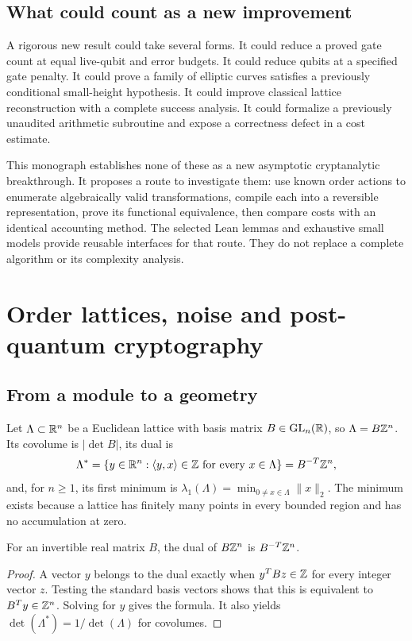 \section{What could count as a new improvement}
A rigorous new result could take several forms. It could reduce a proved gate count at equal live-qubit and error budgets. It could reduce qubits at a specified gate penalty. It could prove a family of elliptic curves satisfies a previously conditional small-height hypothesis. It could improve classical lattice reconstruction with a complete success analysis. It could formalize a previously unaudited arithmetic subroutine and expose a correctness defect in a cost estimate.

This monograph establishes none of these as a new asymptotic cryptanalytic breakthrough. It proposes a route to investigate them: use known order actions to enumerate algebraically valid transformations, compile each into a reversible representation, prove its functional equivalence, then compare costs with an identical accounting method. The selected Lean lemmas and exhaustive small models provide reusable interfaces for that route. They do not replace a complete algorithm or its complexity analysis.

\chapter{Order lattices, noise and post-quantum cryptography}
\label{ch:pqc}
\section{From a module to a geometry}
Let $\Lambda\subset\mathbb{R}^n$ be a Euclidean lattice with basis matrix $B\in\operatorname{GL}_n(\mathbb{R})$, so $\Lambda=B\mathbb{Z}^n$. Its covolume is $|\det B|$, its dual is
\[
 \Lambda^*=\{y\in\mathbb{R}^n:\langle y,x\rangle\in\mathbb{Z}\text{ for every }x\in\Lambda\}
 =B^{-T}\mathbb{Z}^n,
\]
and, for $n\ge1$, its first minimum is
$\lambda_1(\Lambda)=\min_{0\ne x\in\Lambda}\|x\|_2$.
The minimum exists because a lattice has finitely many points in every bounded region and has no accumulation at zero.

\begin{proposition}
For an invertible real matrix $B$, the dual of $B\mathbb{Z}^n$ is $B^{-T}\mathbb{Z}^n$.
\end{proposition}
\begin{proof}
A vector $y$ belongs to the dual exactly when $y^TBz\in\mathbb{Z}$ for every integer vector $z$. Testing the standard basis vectors shows that this is equivalent to $B^Ty\in\mathbb{Z}^n$. Solving for $y$ gives the formula. It also yields
$\det(\Lambda^*)=1/\det(\Lambda)$ for covolumes.
\end{proof}

